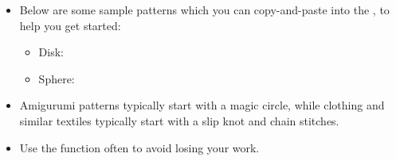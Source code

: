 \documentclass[main.tex]{subfiles}
\begin{document}
\begin{itemize}
\item Below are some sample patterns which you can copy-and-paste into the \PTI*, to help you get started:
    \begin{itemize}
    \item Disk: \\

    \item Sphere: \\
    \end{itemize}

\item Amigurumi patterns typically start with a magic circle, while clothing and similar textiles typically start with a slip knot and chain stitches.
\item Use the  function often to avoid losing your work.
\end{itemize}
\end{document}
